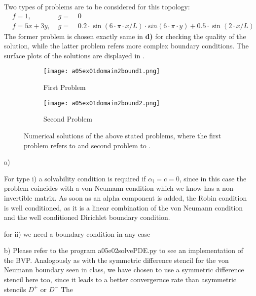 %
Two types of problems are to be considered for this topology:
\begin{align}
	\label{eq:problem1}
	&f = 1, \;    	 & g = & \;0 \\
	\label{eq:problem2}
	&f = 5x + 3y, \; & g = & \; 0.2 \cdot \sin(6\cdot \pi \cdot x/L) \cdot sin(6 \cdot \pi \cdot y) + 0.5 \cdot \sin(2\cdot x/L)
\end{align}
The former problem is chosen exactly same in \textbf{d)} for checking the quality of the solution, while the latter problem refers more complex boundary conditions.
The surface plots of the solutions are displayed in .
%
\begin{figure}[H]
\vspace*{\FigUpperVSpace}
\def\MeshFigWidth{210pt}
	\begin{subfigure}[b]{0.5\hsize}
		\centering
		\texttt{[image: a05ex01domain2bound1.png]} 
		\caption{First Problem}
		\label{fig:a05ex01domain2bound1}
	\end{subfigure}
	\begin{subfigure}[b]{0.5\hsize}
		\centering
		\texttt{[image: a05ex01domain2bound2.png]} 
		\caption{Second Problem}
		\label{fig:a05ex01domain2bound2}
	\end{subfigure}
	\caption{Numerical solutions of the above stated problems, where the first problem refers to  and second problem to .}
	\label{fig:a05ex01f}
\end{figure}

%
%
a)

For type i) a solvability condition is required if $\alpha_i=c=0$, since in this case the problem coincides with a von Neumann condition which we know has a non- invertible matrix. As soon as an alpha component is added, the Robin condition is well conditioned, as it is a linear combination of the von Neumann condition and the well conditioned Dirichlet boundary condition.

for ii) we need a boundary condition in any case

b)
Please refer to the program a05e02solvePDE.py to see an implementation of the BVP. Analogously as with the symmetric difference stencil for the von Neumann boundary seen in class, we have chosen to use a symmetric difference stencil here too, since it leads to a better convergernce rate than asymmetric stencils $D^+$ or $D^-$
The 

%

%

%
%

%

%
%
